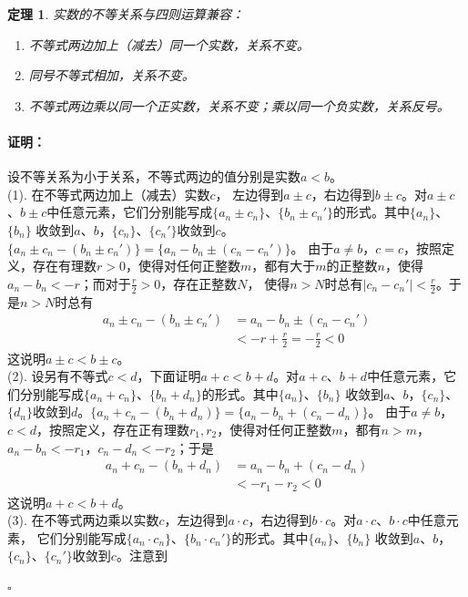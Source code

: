 \documentclass[12pt,UTF8]{ctexbook}
\newtheorem{tm}{定理}[section]
\renewenvironment{proof}{\paragraph{\textbf{证明：}}}{\hfill$\square$}
\begin{document}
\begin{appendix}
\begin{tm}\label{tm:a-1-30}
    实数的不等关系与四则运算兼容：
    \begin{enumerate}
        \item 不等式两边加上（减去）同一个实数，关系不变。
        \item 同号不等式相加，关系不变。
        \item 不等式两边乘以同一个正实数，关系不变；乘以同一个负实数，关系反号。
    \end{enumerate}
\end{tm}
\begin{proof}
    设不等关系为小于关系，不等式两边的值分别是实数$a<b$。\\
    (1). 在不等式两边加上（减去）实数$c$，
    左边得到$a\pm c$，右边得到$b\pm c$。对$a\pm c$、$b\pm c$中任意元素，它们分别能写成$\{a_n\pm c_n\}$、$\{b_n\pm c_n'\}$的形式。其中$\{a_n\}$、$\{b_n\}$
    收敛到$a$、$b$，$\{c_n\}$、$\{c_n'\}$收敛到$c$。$\{a_n\pm c_n-(b_n\pm c_n')\} = \{a_n - b_n \pm  (c_n - c_n')\}$。
    由于$a\neq b$，$c = c$，按照定义，存在有理数$r>0$，使得对任何正整数$m$，都有大于$m$的正整数$n$，使得$a_n - b_n < -r$；而对于$\frac{r}{2}>0$，存在正整数$N$，
    使得$n>N$时总有$|c_n - c_n'| < \frac{r}{2}$。于是$n>N$时总有
    \begin{align*}
        a_n\pm c_n-(b_n\pm c_n') &= a_n - b_n \pm  (c_n - c_n')  \\
        &< -r + \frac{r}{2} = -\frac{r}{2} < 0 
    \end{align*}
    这说明$a\pm c < b\pm c$。\\
    (2). 设另有不等式$c<d$，下面证明$a + c < b + d$。对$a + c$、$b + d$中任意元素，它们分别能写成$\{a_n + c_n\}$、$\{b_n + d_n\}$的形式。其中$\{a_n\}$、$\{b_n\}$
    收敛到$a$、$b$，$\{c_n\}$、$\{d_n\}$收敛到$d$。$\{a_n + c_n-(b_n + d_n)\} = \{a_n - b_n + (c_n - d_n)\}$。
    由于$a\neq b$，$c < d$，按照定义，存在正有理数$r_1,r_2$，使得对任何正整数$m$，都有$n>m$，$a_n - b_n < -r_1$，$c_n - d_n < -r_2$；于是
    \begin{align*}
        a_n + c_n-(b_n + d_n) &= a_n - b_n +  (c_n - d_n)  \\
        &< -r_1 - r_2 < 0 
    \end{align*}
    这说明$a + c < b + d$。\\
    (3). 在不等式两边乘以实数$c$，左边得到$a\cdot c$，右边得到$b\cdot c$。对$a\cdot c$、$b\cdot c$中任意元素，
    它们分别能写成$\{a_n\cdot c_n\}$、$\{b_n\cdot c_n'\}$的形式。其中$\{a_n\}$、$\{b_n\}$
    收敛到$a$、$b$，$\{c_n\}$、$\{c_n'\}$收敛到$c$。注意到

\end{proof}
\end{appendix}
\end{document}
